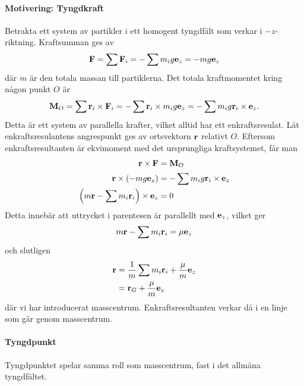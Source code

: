 \paragraph{Motivering: Tyngdkraft}
Betrakta ett system av partikler i ett homogent tyngdfält som verkar i $-z$-riktning. Kraftsumman ges av
\begin{align*}
	\vect{F} = \sum\vect{F}_i = -\sum m_ig\vect{e}_z = -mg\vect{e}_z
\end{align*}
där $m$ är den totala massan till partiklerna. Det totala kraftmomentet kring någon punkt $O$ är
\begin{align*}
	\vect{M}_O = \sum\vect{r}_i\times\vect{F}_i = -\sum \vect{r}_i\times m_ig\vect{e}_z = -\sum m_ig\vect{r}_i\times\vect{e}_z.
\end{align*}
Detta är ett system av parallella krafter, vilket alltid har ett enkraftsresulat. Låt enkraftsresulantens angrespunkt ges av ortsvektorn $\vect{r}$ relativt $O$. Eftersom enkraftsresultanten är ekvimoment med det ursprungliga kraftsystemet, får man
\begin{align*}
	\vect{r}\times\vect{F}                                       &= \vect{M}_O \\
	\vect{r}\times (-mg\vect{e}_z)                               &= -\sum m_ig\vect{r}_i\times\vect{e}_z \\
	\left(m\vect{r} - \sum m_i\vect{r}_i\right)\times\vect{e}_z &= 0
\end{align*}
Detta innebär att uttrycket i parentesen är parallellt med $\vect{e}_z$, vilket ger
\begin{align*}
	m\vect{r} - \sum m_i\vect{r}_i = \mu\vect{e}_z
\end{align*}
och slutligen
\begin{align*}
	\vect{r} &= \frac{1}{m}\sum m_i\vect{r}_i + \frac{\mu}{m}\vect{e}_z \\
	         &= \vect{r}_{G} + \frac{\mu}{m}\vect{e}_z
\end{align*}
där vi har introducerat masscentrum. Enkraftsresultanten verkar då i en linje som går genom masscentrum.

\paragraph{Tyngdpunkt}
Tyngdpunktet spelar samma roll som masscentrum, fast i det allmäna tyngdfältet.